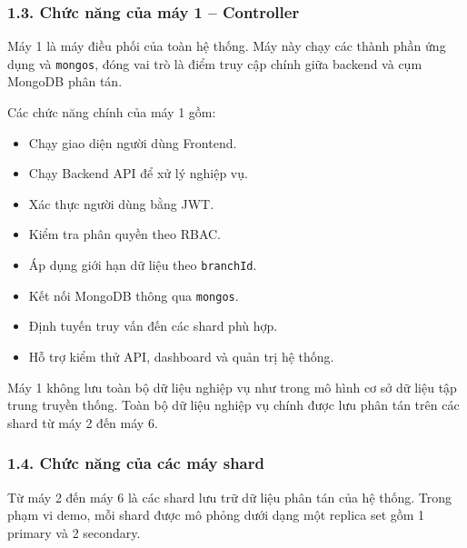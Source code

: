 \documentclass[12pt,a4paper]{article}
\begin{document}
\subsubsection*{1.3. Chức năng của máy 1 -- Controller}

Máy 1 là máy điều phối của toàn hệ thống. Máy này chạy các thành phần ứng dụng và \texttt{mongos}, đóng vai trò là điểm truy cập chính giữa backend và cụm MongoDB phân tán.

Các chức năng chính của máy 1 gồm:

\begin{itemize}
    \item Chạy giao diện người dùng Frontend.
    \item Chạy Backend API để xử lý nghiệp vụ.
    \item Xác thực người dùng bằng JWT.
    \item Kiểm tra phân quyền theo RBAC.
    \item Áp dụng giới hạn dữ liệu theo \texttt{branchId}.
    \item Kết nối MongoDB thông qua \texttt{mongos}.
    \item Định tuyến truy vấn đến các shard phù hợp.
    \item Hỗ trợ kiểm thử API, dashboard và quản trị hệ thống.
\end{itemize}

Máy 1 không lưu toàn bộ dữ liệu nghiệp vụ như trong mô hình cơ sở dữ liệu tập trung truyền thống. Toàn bộ dữ liệu nghiệp vụ chính được lưu phân tán trên các shard từ máy 2 đến máy 6.

\subsubsection*{1.4. Chức năng của các máy shard}

Từ máy 2 đến máy 6 là các shard lưu trữ dữ liệu phân tán của hệ thống. Trong phạm vi demo, mỗi shard được mô phỏng dưới dạng một replica set gồm 1 primary và 2 secondary.
\end{document}
